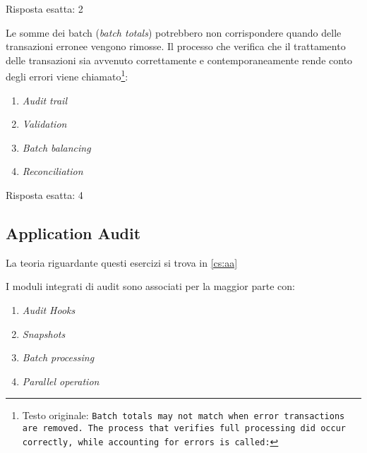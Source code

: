 \begin{Answer} [
  ref={esCs2},
  number={2}
  ]

  \Question Risposta esatta: 2
\end{Answer}

\begin{Exercise} [
  title={Quiz},
  label={esCs3}
  ]

  \Question Le somme dei batch (\textit{batch totals}) potrebbero non
corrispondere quando delle transazioni erronee vengono rimosse.
Il processo che verifica che il trattamento delle transazioni sia
avvenuto correttamente e contemporaneamente rende conto degli errori
viene chiamato\footnote{Testo originale: \texttt{Batch totals may not
match when error transactions are removed. The process that verifies
full processing did occur correctly, while accounting for errors is
called:}}:

\begin{enumerate}
\item \textit{Audit trail}
\item \textit{Validation}
\item \textit{Batch balancing}
\item \textit{Reconciliation}
\end{enumerate}


\end{Exercise}

\begin{Answer} [
  ref={esCs3},
  number={3}
  ]

  \Question Risposta esatta: 4
\end{Answer}


\subsection{Application Audit}
\label{esCs:aa}

La teoria riguardante questi esercizi si trova in \ref{cs:aa}


\begin{Exercise} [
  title={Quiz},
  label={esCs4}
  ]

  \Question I moduli integrati di audit sono associati per la maggior parte con:
\begin{enumerate}
\item \textit{Audit Hooks}
\item \textit{Snapshots}
\item \textit{Batch processing}
\item \textit{Parallel operation}
\end{enumerate}



\end{Exercise}

